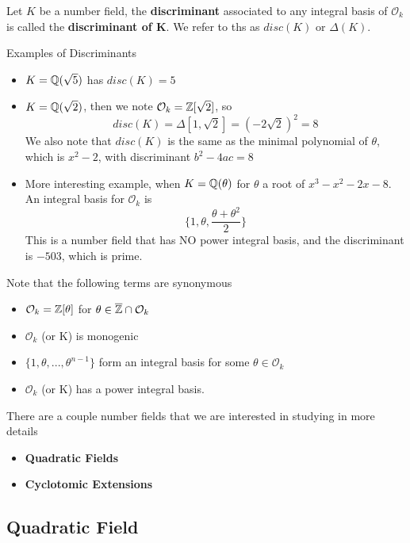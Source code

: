 \begin{definition}
Let $K$ be a number field, the \textbf{discriminant} associated to any integral basis of $\mathcal{O}_k$ is called the \textbf{discriminant of K}. We refer to ths as $disc(K)$ or $\Delta(K)$.
\end{definition}

\begin{example}
Examples of Discriminants
\begin{itemize}
    \item $K = \mathbb{Q}(\sqrt{5})$ has $disc(K) = 5$
    \item $K = \mathbb{Q}(\sqrt{2})$, then we note $\mathcal{O}_k = \mathbb{Z}[\sqrt{2}]$, so
    \[disc(K) = \Delta[1, \sqrt{2}] = (-2\sqrt{2})^2 = 8\]
    We also note that $disc(K)$ is the same as the minimal polynomial of $\theta$, which is $x^2 - 2$, with discriminant $b^2 - 4ac = 8$
    \item More interesting example, when $K = \mathbb{Q}(\theta)$ for $\theta$ a root of $x^3 - x^2 - 2x - 8$. An integral basis for $\mathcal{O}_k$ is 
    \[\{1, \theta, \frac{\theta + \theta^2}{2}\}\]
    This is a number field that has NO power integral basis, and the discriminant is $-503$, which is prime.
\end{itemize}
\end{example}

\begin{definition}
Note that the following terms are synonymous
\begin{itemize}
    \item $\mathcal{O}_k = \mathbb{Z}[\theta]$ for $\theta \in \overline{\mathbb{Z}} \cap \mathcal{O}_k$
    \item $\mathcal{O}_k$ (or K) is monogenic
    \item $\{1, \theta, ..., \theta^{n-1}\}$ form an integral basis for some $\theta \in \mathcal{O}_k$
    \item $\mathcal{O}_k$ (or K) has a power integral basis.
\end{itemize}
\end{definition}

\noindent There are a couple number fields that we are interested in studying in more details
\begin{itemize}
    \item \textbf{Quadratic Fields}
    \item \textbf{Cyclotomic Extensions}
\end{itemize}

\subsection{Quadratic Field}

